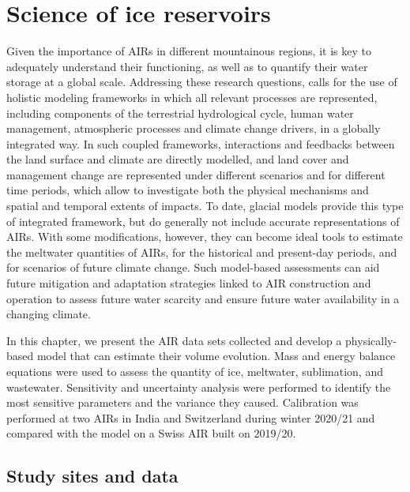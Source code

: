 \chapter{Science of ice reservoirs}
\label{chap:science}


Given the importance of \ac{AIRs} in different mountainous regions, it is key to adequately understand their
functioning, as well as to quantify their water storage at a global scale. Addressing these research questions,
calls for the use of holistic modeling frameworks in which all relevant processes are represented, including
components of the terrestrial hydrological cycle, human water management, atmospheric processes and climate
change drivers, in a globally integrated way. In such coupled frameworks, interactions and feedbacks between the
land surface and climate are directly modelled, and land cover and management change are represented under
different scenarios and for different time periods, which allow to investigate both the physical mechanisms and
spatial and temporal extents of impacts. To date, glacial models provide this type of integrated framework, but
do generally not include accurate representations of \ac{AIRs}. With some modifications, however, they can
become ideal tools to estimate the meltwater quantities of \ac{AIRs}, for the historical and present-day
periods, and for scenarios of future climate change. Such model-based assessments can aid future mitigation and
adaptation strategies linked to AIR construction and operation to assess future water scarcity and ensure future
water availability in a changing climate.

In this chapter, we present the AIR data sets collected and develop a physically-based model that can estimate
their volume evolution. Mass and energy balance equations were used to assess the quantity of ice, meltwater,
sublimation, and wastewater. Sensitivity and uncertainty analysis were performed to identify the most sensitive
parameters and the variance they caused. Calibration was performed at two \ac{AIRs} in India and Switzerland
during winter 2020/21 and compared with the model on a Swiss AIR built on 2019/20.

\section{Study sites and data}

